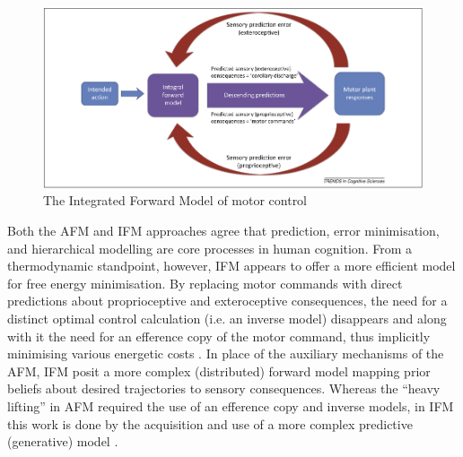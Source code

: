 \begin{figure}[htbp]
  \begin{center}
    \includegraphics[scale=.4]{images/IFM.png}
      \caption{The Integrated Forward Model of motor control}
        \label{fig:IFM}
   \end{center}
\end{figure}


Both the AFM and IFM approaches agree that prediction, error minimisation, and hierarchical modelling are core processes in human cognition. From a thermodynamic standpoint, however, IFM appears to offer a more efficient model for free energy minimisation.  By replacing motor commands with direct predictions about proprioceptive and exteroceptive consequences, the need for a distinct optimal control calculation (i.e. an inverse model) disappears and along with it the need for an efference copy of the motor command, thus implicitly minimising various energetic costs \citep{Pickering2014,Friston2010}.   In place of the auxiliary mechanisms of the AFM, IFM posit a more complex (distributed) forward model mapping prior beliefs about desired trajectories to sensory consequences.  Whereas the ``heavy lifting'' in AFM required the use of an efference copy and inverse models, in IFM this work is done by the acquisition and use of a more complex predictive (generative) model \citep{Pickering2014}.








